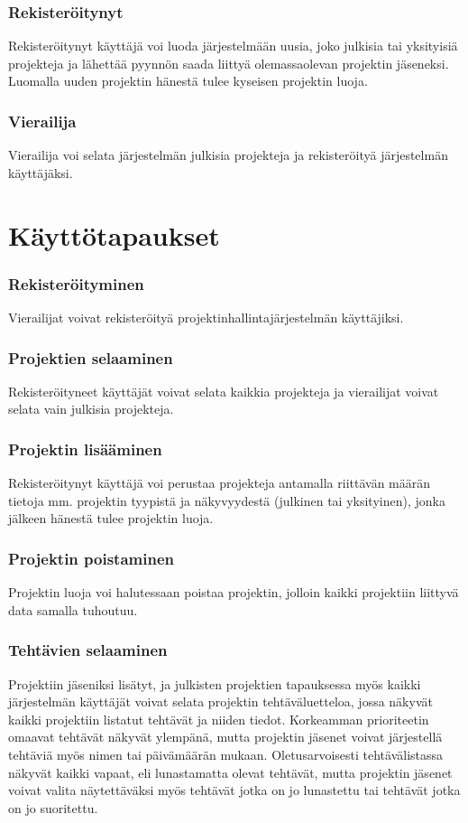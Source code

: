 \documentclass[12pt,a4paper]{article}
\begin{document}
\subsubsection*{Rekisteröitynyt}
Rekisteröitynyt käyttäjä voi luoda järjestelmään uusia, joko julkisia tai yksityisiä projekteja ja lähettää
pyynnön saada liittyä olemassaolevan projektin jäseneksi. Luomalla uuden projektin hänestä tulee
kyseisen projektin luoja.
\subsubsection*{Vierailija}
Vierailija voi selata järjestelmän julkisia projekteja ja rekisteröityä järjestelmän käyttäjäksi.

\section*{Käyttötapaukset}

\subsubsection*{Rekisteröityminen}
Vierailijat voivat rekisteröityä projektinhallintajärjestelmän käyttäjiksi.

\subsubsection*{Projektien selaaminen}
Rekisteröityneet käyttäjät voivat selata kaikkia projekteja ja vierailijat voivat selata vain julkisia projekteja.

\subsubsection*{Projektin lisääminen}
Rekisteröitynyt käyttäjä voi perustaa projekteja antamalla riittävän määrän tietoja mm. projektin
tyypistä ja näkyvyydestä (julkinen tai yksityinen), jonka jälkeen hänestä tulee projektin luoja.

\subsubsection*{Projektin poistaminen}
Projektin luoja voi halutessaan poistaa projektin, jolloin kaikki projektiin liittyvä data samalla
tuhoutuu.

\subsubsection*{Tehtävien selaaminen}
Projektiin jäseniksi lisätyt, ja julkisten projektien tapauksessa myös kaikki järjestelmän käyttäjät
voivat selata projektin tehtäväluetteloa, jossa näkyvät kaikki projektiin listatut tehtävät ja niiden tiedot.
Korkeamman prioriteetin omaavat tehtävät näkyvät ylempänä, mutta projektin jäsenet voivat järjestellä
tehtäviä myös nimen tai päivämäärän mukaan. Oletusarvoisesti tehtävälistassa näkyvät kaikki vapaat, eli
lunastamatta olevat tehtävät, mutta projektin jäsenet voivat valita näytettäväksi myös tehtävät jotka on
jo lunastettu tai tehtävät jotka on jo suoritettu.
\end{document}
